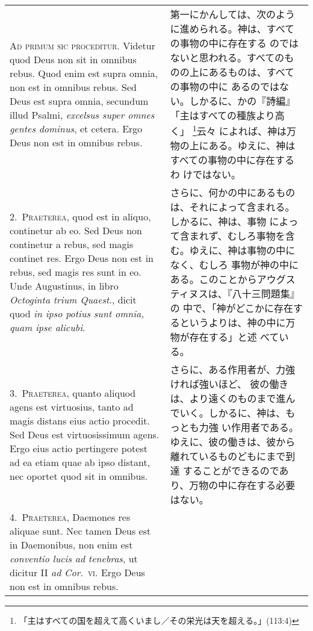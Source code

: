 \documentclass[10pt]{jsarticle} %
\begin{document}
\begin{longtable}{p{21em}p{21em}}

{\huge A}{\scshape d primum sic proceditur}. Videtur quod Deus non sit in omnibus
 rebus. Quod enim est supra omnia, non est in omnibus rebus. Sed Deus
 est supra omnia, secundum illud Psalmi, {\itshape excelsus super omnes gentes
 dominus}, et cetera. Ergo Deus non est in omnibus rebus.
&

第一にかんしては、次のように進められる。神は、すべての事物の中に存在する
 のではないと思われる。すべてのものの上にあるものは、すべての事物の中に
 あるのではない。しかるに、かの『詩編』「主はすべての種族より高く」
 \footnote{「主はすべての国を超えて高くいまし／その栄光は天を超える。」(113:4)}云々
 によれば、神は万物の上にある。ゆえに、神はすべての事物の中に存在するわ
 けではない。

\\

2.~{\scshape Praeterea}, quod est in aliquo, continetur ab eo. Sed Deus non
 continetur a rebus, sed magis continet res. Ergo Deus non est in rebus,
 sed magis res sunt in eo. Unde Augustinus, in libro {\itshape Octoginta trium
 Quaest}., dicit quod {\itshape in ipso potius sunt omnia, quam ipse alicubi}.

&

さらに、何かの中にあるものは、それによって含まれる。しかるに、神は、事物
 によって含まれず、むしろ事物を含む。ゆえに、神は事物の中になく、むしろ
 事物が神の中にある。このことからアウグスティヌスは、『八十三問題集』の
 中で、「神がどこかに存在するというよりは、神の中に万物が存在する」と述
 べている。


\\


3.~{\scshape Praeterea}, quanto aliquod agens est virtuosius, tanto ad magis
 distans eius actio procedit. Sed Deus est virtuosissimum agens. Ergo
 eius actio pertingere potest ad ea etiam quae ab ipso distant, nec
 oportet quod sit in omnibus.

&

 さらに、ある作用者が、力強ければ強いほど、
 彼の働きは、より遠くのものまで進んでいく。しかるに、神は、もっとも力強
 い作用者である。ゆえに、彼の働きは、彼から離れているものどもにまで到達
 することができるのであり、万物の中に存在する必要はない。

\\

4.~{\scshape Praeterea}, Daemones res aliquae sunt. Nec tamen Deus est in
 Daemonibus, non enim est {\itshape conventio lucis ad tenebras}, ut dicitur II {\itshape ad Cor}.~{\scshape vi}. Ergo Deus non est in omnibus rebus.
&


\end{longtable}
\end{document}

